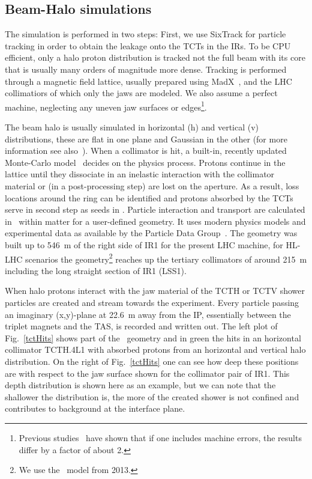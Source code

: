 \subsection{Beam-Halo simulations}
The simulation is performed in two steps: First, we use SixTrack for particle tracking in order to obtain the leakage onto the TCTs in the IRs. To be CPU efficient, only a halo proton distribution is tracked not the full beam with its core that is usually many orders of magnitude more dense. Tracking is performed through a magnetic field lattice, usually prepared using MadX~\cite{madx}, and the LHC collimatiors of which only the jaws are modeled. We also assume a perfect machine, neglecting any uneven jaw surfaces or edges\footnote{Previous studies~\cite{roderikSimMeasPaper} have shown that if one includes machine errors, the results differ by a factor of about 2.}.

The beam halo is usually simulated in horizontal (h) and vertical (v) distributions, these are flat in one plane and Gaussian in the other (for more information see also~\cite{chiarasThesis}). When a collimator is hit, a built-in, recently updated Monte-Carlo model~\cite{claudiasThesis} decides on the physics process. Protons continue in the lattice until they dissociate in an inelastic interaction with the collimator material or (in a post-processing step) are lost on the aperture. As a result, loss locations around the ring can be identified and protons absorbed by the TCTs serve in second step as seeds in \fluka. Particle interaction and transport are calculated in \fluka~within matter for a user-defined geometry. It uses modern physics models and experimental data as available by the Particle Data Group~\cite{pdg}. The geometry was built up to 546~m of the right side of IR1 for the present LHC machine, for HL-LHC scenarios the geometry\footnote{We use the \fluka~model from 2013.} reaches up the tertiary collimators of around 215~m including the long straight section of IR1 (LSS1).

When halo protons interact with the jaw material of the TCTH or TCTV shower particles are created and stream towards the experiment. Every particle passing an imaginary (x,y)-plane at 22.6~m away from the IP, essentially between the triplet magnets and the TAS, is recorded and written out. The left plot of Fig.~\ref{tctHits} shows part of the \fluka~geometry and in green the hits in an horizontal collimator TCTH.4L1 with absorbed protons from an horizontal and vertical halo distribution. On the right of Fig.~\ref{tctHits} one can see how deep these positions are with respect to the jaw surface shown for the collimator pair of IR1. This depth distribution is shown here as an example, but we can note that the shallower the distribution is, the more of the created shower is not confined and contributes to background at the interface plane.

